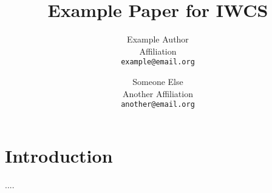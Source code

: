 \documentclass[a4paper,11pt]{article}
\title{Example Paper for IWCS}
\date{}
\author{Example Author\\
       Affiliation\\
       \texttt{example@email.org}
  \and Someone Else\\
       Another Affiliation\\
       \texttt{another@email.org}
}
\begin{document}
\maketitle
\thispagestyle{empty}
\pagestyle{empty}

\section{Introduction}

....

\cite{alfandre-2009}

\cite{brookes-2016}

\cite{smailhodzic-2016}

\cite{proferes-2021}



\end{document}
